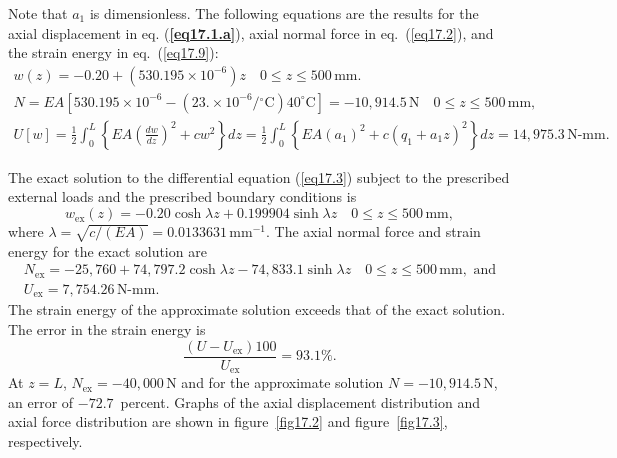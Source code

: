 \documentclass{AeroStructure-ERJohnson}
\begin{document}
\begin{example}
\begin{equation}
\end{equation}
Note that $a_1$ is dimensionless. The following equations are the results for the axial displacement in eq. (\textbf{\ref{eq17.1.a}}), axial normal force in eq.~(\ref{eq17.2}), and the strain energy in eq.~(\ref{eq17.9}):
\begin{gather}
w(z)=-0.20+\left(530.195 \times 10^{-6}\right) z \quad 0 \leq z \leq 500\,\mathrm{mm}. \label{eq17.1.g}\tag{g} \\
N=E A\left[530.195 \times 10^{-6}-\left(23 . \times 10^{-6} /{ }^{\circ} \mathrm{C}\right) 40^{\circ} \mathrm{C}\right]=-10,914.5\,\mathrm{N} \quad 0 \leq z \leq 500\,\mathrm{mm}, \label{eq17.1.h}\tag{h} \\
U[w]=\frac{1}{2} \int_{0}^{L}\left\{E A\left(\frac{d w}{d z}\right)^{2}+c w^{2}\right\} d z=\frac{1}{2} \int_{0}^{L}\left\{E A\left(a_{1}\right)^{2}+c\left(q_{1}+a_{1} z\right)^{2}\right\} d z=14,975.3\,\textrm{N-mm}.  \label{eq17.1.i}\tag{i}
\end{gather}

The exact solution to the differential equation (\ref{eq17.3}) subject to the prescribed external loads and the prescribed boundary conditions is
\begin{equation}
w_{\mathrm{ex}}(z)=-0.20 \cosh \lambda z+0.199904 \sinh \lambda z \quad 0 \leq z \leq 500\,\mathrm{mm}, \label{eq17.1.j}\tag{j}
\end{equation}
where $\lambda=\sqrt{c /(E A)}=0.0133631\,\mathrm{mm}^{-1}$. The axial normal force and strain energy for the exact solution are
\begin{gather}
N_{\mathrm{ex}}=-25,760+74,797.2 \cosh \lambda z-74,833.1 \sinh \lambda z \quad 0 \leq z \leq 500\,\mathrm{mm}, \textrm{ and}\label{eq17.1.k}\tag{k} \\
U_{\mathrm{ex}}=7,754.26\,\textrm{N-mm}. \label{eq17.1.l}\tag{l}
\end{gather}
The strain energy of the approximate solution exceeds that of the exact solution. The error in the strain energy is
\begin{equation}
\frac{\left(U-U_{\mathrm{ex}}\right) 100}{U_{\mathrm{ex}}}=93.1 \%. \label{eq17.1.m}\tag{m}
\end{equation}
At $z=L$, $N_{\mathrm{ex}}=-40{,}000\,\mathrm{N}$ and for the approximate solution $N=-10{,}914.5\,\mathrm{N}$, an error of $-72.7$~percent. Graphs of the axial displacement distribution and axial force distribution are shown in figure~\ref{fig17.2} and figure~\ref{fig17.3}, respectively.


\end{example}
\end{document}

